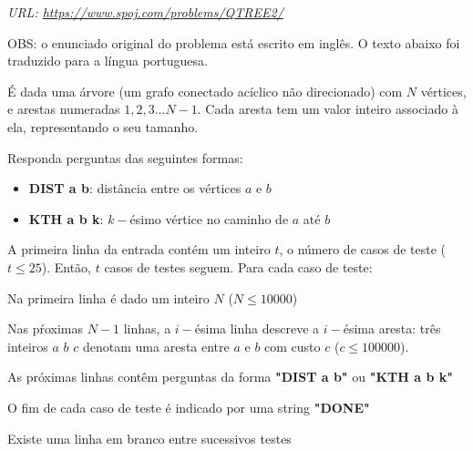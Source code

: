 \textit{URL: \url{https://www.spoj.com/problems/QTREE2/}}

\vspace{0.3cm}OBS: o enunciado original do problema está escrito em inglês. O texto abaixo foi traduzido para a língua portuguesa.\vspace{0.3cm}

\begin{mdframed}[backgroundcolor=blue!5]
\vspace{-0.5cm}

\vspace{0.2cm}

É dada uma árvore (um grafo conectado acíclico não direcionado) com $N$ vértices, e arestas numeradas $1, 2, 3...N-1$. Cada aresta tem um valor inteiro associado à ela, representando o seu tamanho.

Responda perguntas das seguintes formas:

\begin{itemize}
    \item \textbf{DIST a b}: distância entre os vértices $a$ e $b$
    \item \textbf{KTH a b k}: $k-$ésimo vértice no caminho de $a$ até $b$
\end{itemize}

\vspace{0.2cm}

A primeira linha da entrada contém um inteiro $t$, o número de casos de teste ($t \leq 25$). Então, $t$ casos de testes seguem. Para cada caso de teste: \vspace{0.1cm}

Na primeira linha é dado um inteiro $N$ ($N \leq 10000$)

Nas pŕoximas $N-1$ linhas, a $i-$ésima linha descreve a $i-$ésima aresta: três inteiros $a$ $b$ $c$ denotam uma aresta entre $a$ e $b$ com custo $c$ ($c \leq 100000$).

As próximas linhas contêm perguntas da forma \textbf{"DIST a b"} ou \textbf{"KTH a b k"}

O fim de cada caso de teste é indicado por uma string \textbf{"DONE"}

Existe uma linha em branco entre sucessivos testes

\vspace{0.2cm}


\end{mdframed}
